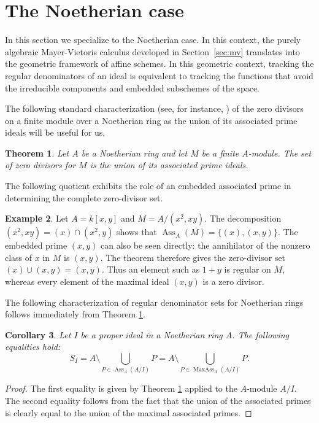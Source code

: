 \documentclass[11pt,leqno]{amsart}
\newtheorem{theorem}{Theorem}[section]
\newtheorem{corollary}[theorem]{Corollary}
\theoremstyle{definition}
\newtheorem{example}[theorem]{Example}
\numberwithin{equation}{section}
\DeclareMathOperator{\Ass}{Ass}
\DeclareMathOperator{\MaxAss}{MaxAss}
\begin{document}
\section{The Noetherian case}\label{sec:noeth}
In this section we specialize to the Noetherian case. In this context, the purely algebraic Mayer-Vietoris calculus developed in Section~\ref{sec:mv} translates into the geometric framework of affine schemes. In this geometric context, tracking the regular denominators of an ideal is equivalent to tracking the functions that avoid the irreducible components and embedded subschemes of the space. 


The following standard characterization (see, for instance, \cite[Theorem 6.1(ii), p. 38]{Mat86}) of the zero divisors on a finite module over a Noetherian ring as the union of its associated prime ideals will be useful for us.

\begin{theorem}\label{thmcharzerodiv}
Let $A$ be a Noetherian ring and let $M$ be a finite $A$-module. The set of zero divisors for $M$ is the union of its associated prime ideals.
\end{theorem}

The following quotient exhibits the role of an embedded associated prime in determining the complete zero-divisor set.

\begin{example}
Let $A=k[x,y]$ and $M=A/(x^2,xy)$. The decomposition
$
(x^2,xy)=(x)\cap(x^2,y)
$
shows that
$
\Ass_A(M)=\{(x),(x,y)\}.
$
The embedded prime $(x,y)$ can also be seen directly: the annihilator of the nonzero class of $x$ in $M$ is $(x,y)$. The theorem therefore gives the zero-divisor set
$
(x)\cup(x,y)=(x,y).
$
Thus an element such as $1+y$ is regular on $M$, whereas every element of the maximal ideal $(x,y)$ is a zero divisor.
\end{example}

The following characterization of regular denominator sets for Noetherian rings follows immediately from Theorem \ref{thmcharzerodiv}.
\begin{corollary}\label{corollcharS_INoeth}
    Let $I$ be a proper ideal in a Noetherian ring $A$. The following equalities hold:
    $$S_I = A \setminus \bigcup_{P \in \Ass_A(A/I)} P=A \setminus \bigcup_{P \in \MaxAss_A(A/I)}P.$$
\end{corollary}

\begin{proof}
    The first equality is given by Theorem \ref{thmcharzerodiv} applied to the $A$-module $A/I$. The second equality follows from the fact that the union of the associated primes is clearly equal to the union of the maximal associated primes.
\end{proof}
\end{document}
